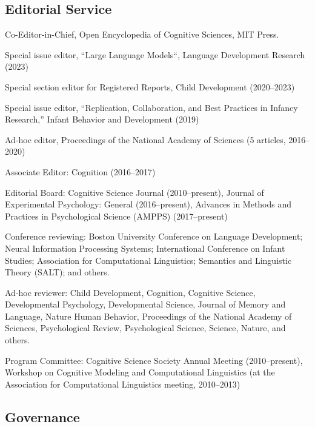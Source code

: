 \documentclass{article}
\renewenvironment{itemize}{
\begin{list}{}{
  \setlength{\leftmargin}{1.5em}
  }
  }{
\end{list}
}
\begin{document}
\subsection*{Editorial Service}

\begin{itemize}
\item Co-Editor-in-Chief, Open Encyclopedia of Cognitive Sciences, MIT Press.
\item Special issue editor, ``Large Language Models``, Language Development Research (2023)
\item Special section editor for Registered Reports, Child Development (2020--2023)
\item Special issue editor, ``Replication, Collaboration, and Best Practices in Infancy Research,'' Infant Behavior and Development (2019)
\item Ad-hoc editor, Proceedings of the National Academy of Sciences (5 articles, 2016--2020)
\item Associate Editor: Cognition (2016--2017)
\item Editorial Board: Cognitive Science Journal (2010--present), Journal of Experimental Psychology: General (2016--present), Advances in Methods and Practices in Psychological Science (AMPPS) (2017--present)
\item Conference reviewing: Boston University Conference on Language Development; Neural Information Processing Systems; International Conference on Infant Studies; Association for Computational Linguistics; Semantics and Linguistic Theory (SALT); and others.
\item Ad-hoc reviewer: Child Development, Cognition, Cognitive Science, Developmental Psychology, Developmental Science, Journal of Memory and Language, Nature Human Behavior, Proceedings of the National Academy of Sciences, Psychological Review, Psychological Science, Science, Nature, and others.
\item Program Committee: Cognitive Science Society Annual Meeting (2010--present), Workshop on Cognitive Modeling and Computational Linguistics (at the Association for Computational Linguistics meeting, 2010--2013)
\end{itemize}

\subsection*{Governance}
\end{document}
